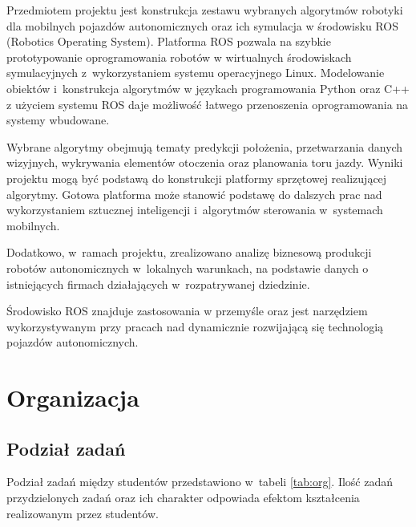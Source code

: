 Przedmiotem projektu jest konstrukcja zestawu wybranych algorytmów robotyki dla
mobilnych pojazdów autonomicznych oraz ich symulacja w środowisku ROS (Robotics
Operating
System). Platforma ROS pozwala na szybkie prototypowanie oprogramowania robotów
w wirtualnych środowiskach symulacyjnych z~wykorzystaniem systemu operacyjnego
Linux.
Modelowanie obiektów i~konstrukcja algorytmów w językach programowania Python
oraz C++ z użyciem systemu ROS daje możliwość łatwego przenoszenia
oprogramowania na systemy wbudowane.

Wybrane algorytmy obejmują tematy predykcji położenia, przetwarzania danych
wizyjnych, wykrywania elementów otoczenia oraz planowania toru jazdy. Wyniki
projektu mogą być podstawą do konstrukcji platformy sprzętowej realizującej
algorytmy. Gotowa platforma może stanowić podstawę do dalszych prac nad
wykorzystaniem sztucznej inteligencji i~algorytmów sterowania w~systemach
mobilnych.

Dodatkowo, w~ramach projektu, zrealizowano analizę biznesową produkcji robotów
autonomicznych w~lokalnych warunkach, na podstawie danych o istniejących
firmach działających w~rozpatrywanej dziedzinie.

Środowisko ROS znajduje zastosowania w przemyśle oraz jest narzędziem
wykorzystywanym przy pracach nad dynamicznie rozwijającą się technologią
pojazdów autonomicznych.

\chapter{Organizacja}
\section{Podział zadań}
Podział zadań między studentów przedstawiono w~tabeli \ref{tab:org}.
Ilość zadań przydzielonych zadań oraz ich charakter odpowiada efektom
kształcenia realizowanym przez studentów.

